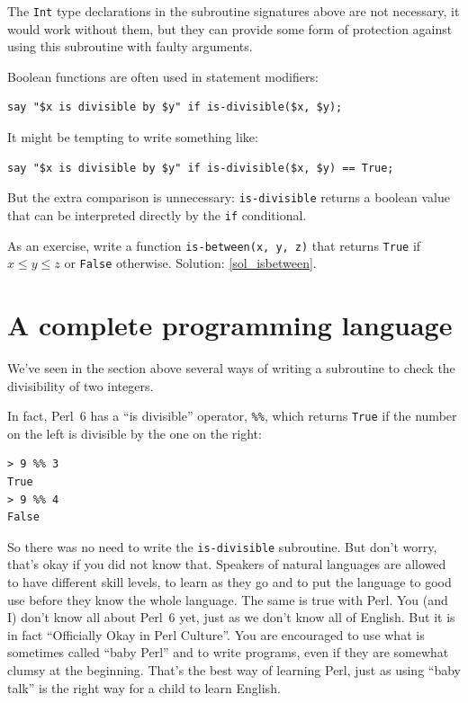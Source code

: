 The {\tt Int} type declarations in the subroutine signatures above 
are not necessary, it would work without them, but they can provide 
some form of protection against using this subroutine with 
faulty arguments.

Boolean functions are often used in statement modifiers:

\begin{verbatim}
say "$x is divisible by $y" if is-divisible($x, $y);
\end{verbatim}
%
It might be tempting to write something like:

\begin{verbatim}
say "$x is divisible by $y" if is-divisible($x, $y) == True;
\end{verbatim}
%
But the extra comparison is unnecessary: {\tt is-divisible} 
returns a boolean value that can be interpreted directly by
the {\tt if} conditional.

\label{isbetween}
As an exercise, write a function \verb"is-between(x, y, z)" that
returns {\tt True} if $x \le y \le z$ or {\tt False} otherwise.
Solution: \ref{sol_isbetween}.

\section{A complete programming language}

We've seen in the section above several ways of writing a 
subroutine to check the divisibility of two integers.

In fact, Perl~6 has a ``is divisible'' operator, \verb'%%', which returns {\tt True} if the number on the left is divisible by the one on the right:

\begin{verbatim}
> 9 %% 3
True
> 9 %% 4
False
\end{verbatim}

So there was no need to write the {\tt is-divisible} subroutine. 
But don't worry, that's okay if you did not know that. 
Speakers of natural languages are allowed to have different 
skill levels, to learn as they go and to put the language 
to good use before they know the whole language. The same 
is true with Perl. You (and I) don't know all about Perl~6 
yet, just as we don't know all of English. But it is in fact 
``Officially Okay in Perl Culture''. You are 
encouraged to use what is sometimes called ``baby Perl'' and 
to write programs, even if they are somewhat clumsy at the 
beginning. That's the best way of learning Perl, just as using 
``baby talk'' is the right way for a child to learn English.

